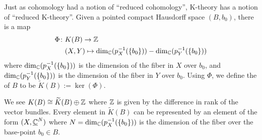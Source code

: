 \begin{definition}
Just as cohomology had a notion of ``reduced cohomology'', K-theory
has a notion of ``reduced K-theory''. Given a pointed compact
Hausdorff space $(B,b_{0})$, there is a map
\begin{equation}
\begin{split}
  \Phi\colon&K(B)\to\mathbb{Z}\\
  &(X,Y)\mapsto\dim_{\mathbb{C}}(p_{X}^{-1}(\{b_{0}\}))-\dim_{\mathbb{C}}(p_{Y}^{-1}(\{b_{0}\}))
\end{split}
\end{equation}
where $\dim_{\mathbb{C}}(p_{X}^{-1}(\{b_{0}\}))$ is the dimension of the
fiber in $X$ over $b_{0}$, and $\dim_{\mathbb{C}}(p_{Y}^{-1}(\{b_{0}\}))$ is
the dimension of the fiber in $Y$ over $b_{0}$. Using $\Phi$, we
define the  of $B$ to be $\widetilde{K}(B):=\ker(\Phi)$.
\end{definition}

\begin{remark}
We see $K(B)\cong\widetilde{K}(B)\oplus\mathbb{Z}$ where $\mathbb{Z}$ is given by the
difference in rank of the vector bundles. Every element in
$\widetilde{K}(B)$ can be represented by an element of the form
$(X,\underline{\mathbb{C}}^{N})$ where $N=\dim_{\mathbb{C}}(p_{X}^{-1}(\{b_{0}\}))$
is the dimension of the fiber over the base-point $b_{0}\in B$.
\end{remark}